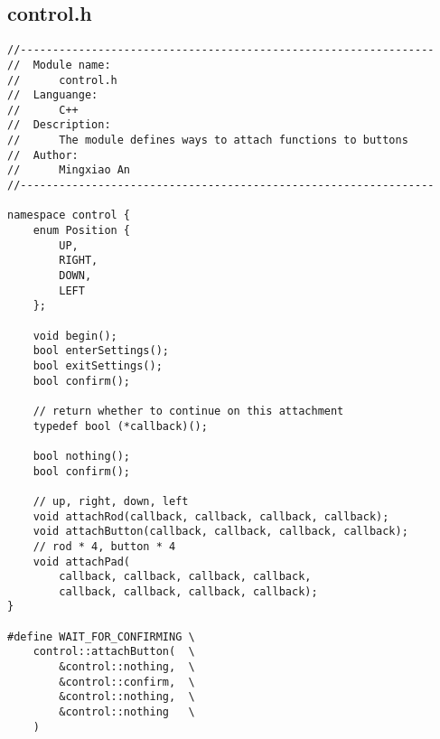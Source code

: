 \subsection{control.h}
\begin{verbatim}
//----------------------------------------------------------------
//  Module name:
//      control.h
//  Languange:
//      C++
//  Description:
//      The module defines ways to attach functions to buttons
//  Author:
//      Mingxiao An
//----------------------------------------------------------------

namespace control {
    enum Position {
        UP,
        RIGHT,
        DOWN,
        LEFT
    };

    void begin();
    bool enterSettings();
    bool exitSettings();
    bool confirm();

    // return whether to continue on this attachment
    typedef bool (*callback)();

    bool nothing();
    bool confirm();

    // up, right, down, left
    void attachRod(callback, callback, callback, callback);
    void attachButton(callback, callback, callback, callback);
    // rod * 4, button * 4
    void attachPad(
        callback, callback, callback, callback, 
        callback, callback, callback, callback);
}

#define WAIT_FOR_CONFIRMING \
    control::attachButton(  \
        &control::nothing,  \
        &control::confirm,  \
        &control::nothing,  \
        &control::nothing   \
    )
\end{verbatim}

